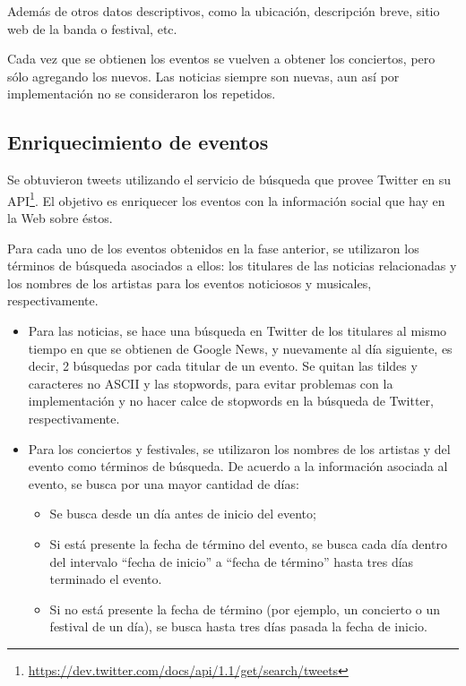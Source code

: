 \documentclass[upright, contnum]{umemoria}
\begin{document}
{\begin{itemize}
  Además de otros datos descriptivos, como la ubicación, descripción
  breve, sitio web de la banda o festival, etc.
\end{itemize}
Cada vez que se obtienen los eventos se vuelven a obtener los
conciertos, pero sólo agregando los nuevos. Las noticias siempre son
nuevas, aun así por implementación no se consideraron los repetidos.
  
\subsection{Enriquecimiento de eventos}
\label{sec-6.2.2}


Se obtuvieron tweets utilizando el servicio de búsqueda que provee
Twitter en su
API\footnote{\href{https://dev.twitter.com/docs/api/1.1/get/search/tweets}{https://dev.twitter.com/docs/api/1.1/get/search/tweets} }. El
objetivo es enriquecer los eventos con la información social que hay
en la Web sobre éstos. 

Para cada uno de los eventos obtenidos en la fase anterior, se
utilizaron los términos de búsqueda asociados a ellos: los titulares
de las noticias relacionadas y los nombres de los artistas para los
eventos noticiosos y musicales, respectivamente.

\begin{itemize}
\item Para las noticias, se hace una búsqueda en Twitter de los titulares
  al mismo tiempo en que se obtienen de Google News, y nuevamente al
  día siguiente, es decir, 2 búsquedas por cada titular de un evento.
  Se quitan las tildes y caracteres no ASCII y las stopwords, para
  evitar problemas con la implementación y no hacer calce de stopwords
  en la búsqueda de Twitter, respectivamente.
\item Para los conciertos y festivales, se utilizaron los nombres de los
  artistas y del evento como términos de búsqueda. De acuerdo a la
  información asociada al evento, se busca por una mayor cantidad de
  días:

\begin{itemize}
\item Se busca desde un día antes de inicio del evento;
\item Si está presente la fecha de término del evento, se busca cada día
    dentro del intervalo ``fecha de inicio'' a ``fecha de término'' hasta
    tres días terminado el evento.
\item Si no está presente la fecha de término (por ejemplo, un concierto
    o un festival de un día), se busca hasta tres días pasada la fecha
    de inicio.
\end{itemize}


\end{itemize}}
\end{document}
